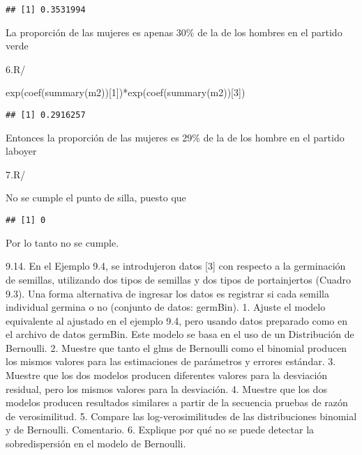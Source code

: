 \documentclass[
]{article}
\newenvironment{Shaded}{\begin{snugshade}}{\end{snugshade}}
\newcommand{\DecValTok}[1]{\textcolor[rgb]{0.00,0.00,0.81}{#1}}
\newcommand{\FunctionTok}[1]{\textcolor[rgb]{0.00,0.00,0.00}{#1}}
\newcommand{\NormalTok}[1]{#1}
\newcommand{\SpecialCharTok}[1]{\textcolor[rgb]{0.00,0.00,0.00}{#1}}
\begin{document}
\begin{verbatim}
## [1] 0.3531994
\end{verbatim}

La proporción de las mujeres es apenas 30\% de la de los hombres en el
partido verde

6.R/

\begin{Shaded}
\begin{Highlighting}[]
\FunctionTok{exp}\NormalTok{(}\FunctionTok{coef}\NormalTok{(}\FunctionTok{summary}\NormalTok{(m2))[}\DecValTok{1}\NormalTok{])}\SpecialCharTok{*}\FunctionTok{exp}\NormalTok{(}\FunctionTok{coef}\NormalTok{(}\FunctionTok{summary}\NormalTok{(m2))[}\DecValTok{3}\NormalTok{])}
\end{Highlighting}
\end{Shaded}

\begin{verbatim}
## [1] 0.2916257
\end{verbatim}

Entonces la proporción de las mujeres es 29\% de la de los hombre en el
partido laboyer

7.R/

No se cumple el punto de silla, puesto que

\begin{Shaded}
\end{Shaded}

\begin{verbatim}
## [1] 0
\end{verbatim}

Por lo tanto no se cumple.

9.14. En el Ejemplo 9.4, se introdujeron datos {[}3{]} con respecto a la
germinación de semillas, utilizando dos tipos de semillas y dos tipos de
portainjertos (Cuadro 9.3). Una forma alternativa de ingresar los datos
es registrar si cada semilla individual germina o no (conjunto de datos:
germBin). 1. Ajuste el modelo equivalente al ajustado en el ejemplo 9.4,
pero usando datos preparado como en el archivo de datos germBin. Este
modelo se basa en el uso de un Distribución de Bernoulli. 2. Muestre que
tanto el glms de Bernoulli como el binomial producen los mismos valores
para las estimaciones de parámetros y errores estándar. 3. Muestre que
los dos modelos producen diferentes valores para la desviación residual,
pero los mismos valores para la desviación. 4. Muestre que los dos
modelos producen resultados similares a partir de la secuencia pruebas
de razón de verosimilitud. 5. Compare las log-verosimilitudes de las
distribuciones binomial y de Bernoulli. Comentario. 6. Explique por qué
no se puede detectar la sobredispersión en el modelo de Bernoulli.
\end{document}
